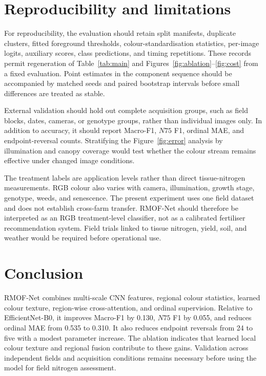 \documentclass[10pt,letterpaper,twocolumn]{article}
\newcommand{\Nmid}{$N75$}
\newcommand{\method}{RMOF-Net}
\begin{document}
\section{Reproducibility and limitations}

For reproducibility, the evaluation should retain split manifests, duplicate clusters, fitted foreground thresholds, colour-standardisation statistics, per-image logits, auxiliary scores, class predictions, and timing repetitions. These records permit regeneration of Table~\ref{tab:main} and Figures~\ref{fig:ablation}--\ref{fig:cost} from a fixed evaluation. Point estimates in the component sequence should be accompanied by matched seeds and paired bootstrap intervals before small differences are treated as stable.

External validation should hold out complete acquisition groups, such as field blocks, dates, cameras, or genotype groups, rather than individual images only. In addition to accuracy, it should report Macro-F1, \Nmid{} F1, ordinal MAE, and endpoint-reversal counts. Stratifying the Figure~\ref{fig:error} analysis by illumination and canopy coverage would test whether the colour stream remains effective under changed image conditions.

The treatment labels are application levels rather than direct tissue-nitrogen measurements. RGB colour also varies with camera, illumination, growth stage, genotype, weeds, and senescence. The present experiment uses one field dataset and does not establish cross-farm transfer. \method{} should therefore be interpreted as an RGB treatment-level classifier, not as a calibrated fertiliser recommendation system. Field trials linked to tissue nitrogen, yield, soil, and weather would be required before operational use.

\section{Conclusion}

\method{} combines multi-scale CNN features, regional colour statistics, learned colour texture, region-wise cross-attention, and ordinal supervision. Relative to EfficientNet-B0, it improves Macro-F1 by 0.130, \Nmid{} F1 by 0.055, and reduces ordinal MAE from 0.535 to 0.310. It also reduces endpoint reversals from 24 to five with a modest parameter increase. The ablation indicates that learned local colour texture and regional fusion contribute to these gains. Validation across independent fields and acquisition conditions remains necessary before using the model for field nitrogen assessment.
\end{document}
